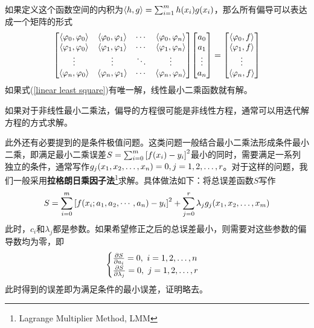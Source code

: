 \documentclass[12pt,a4paper,openany,twoside]{book}
\numberwithin{equation}{section}
\newcommand{\mean}[1]{\left\langle #1 \right\rangle}
\begin{document}
            如果定义这个函数空间的内积为$\mean{h,g}=\sum_{i=1}^m{h\qty(x_i)g\qty(x_i)}$，那么所有偏导可以表达成一个矩阵的形式
            \begin{equation}
              \mqty[
                \mean{\varphi_0,\varphi_0}&\mean{\varphi_0,\varphi_1}&\cdots&\mean{\varphi_0,\varphi_n}\\
                \mean{\varphi_1,\varphi_0}&\mean{\varphi_1,\varphi_1}&\cdots&\mean{\varphi_1,\varphi_n}\\
                \vdots&\vdots&\ddots&\vdots\\
                \mean{\varphi_n,\varphi_0}&\mean{\varphi_n,\varphi_1}&\cdots&\mean{\varphi_n,\varphi_n}
              ]\mqty[
                a_0\\
                a_1\\
                \vdots\\
                a_n
              ]=\mqty[
                \mean{\varphi_0,f}\\
                \mean{\varphi_1,f}\\
                \vdots\\
                \mean{\varphi_n,f}
              ]
              \label{linear least square}
            \end{equation}
            如果式(\ref{linear least square})有唯一解，线性最小二乘函数就有解。

            如果对于非线性最小二乘法，偏导的方程很可能是非线性方程，通常可以用迭代解方程的方式求解。

            此外还有必要提到的是条件极值问题。这类问题一般结合最小二乘法形成条件最小二乘，即满足最小二乘误差$S=\sum_{i=0}^m{\qty[f\qty(x_i)-y_i]^2}$最小的同时，需要满足一系列独立的条件，通常写作$g_j\qty(x_1,x_2,\dots,x_n)=0,j=1,2,\dots,r$。对于这样的问题，我们一般采用\textbf{拉格朗日乘因子法}\footnote{Lagrange Multiplier Method, LMM}求解。具体做法如下：将总误差函数$S$写作
            \begin{equation}
              S=\sum_{i=0}^m{\qty[f\qty(x_i;a_1,a_2,\cdots,a_n)-y_i]^2}+\sum_{j=0}^r{\lambda_j g_j\qty(x_1,x_2,\dots,x_m)}
            \end{equation}
            此时，$c_i$和$\lambda_j$都是参数。如果希望修正之后的总误差最小，则需要对这些参数的偏导数均为零，即
            \begin{equation}
              \begin{cases}
                \pdv{S}{a_i}=0,\ i=1,2,\dots,n\\
                \pdv{S}{\lambda_j}=0,\ j=1,2,\dots,r
              \end{cases}
            \end{equation}
            此时得到的误差即为满足条件的最小误差，证明略去。
\end{document}
